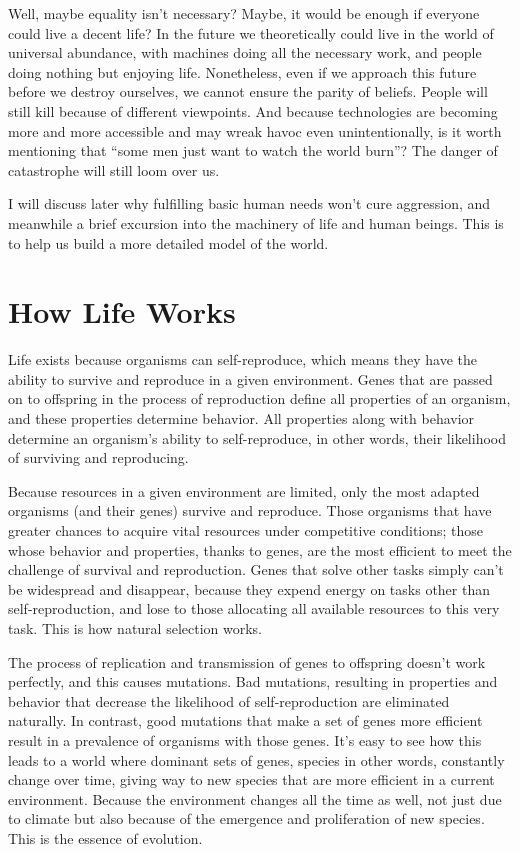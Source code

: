 \documentclass[12pt]{report}
\begin{document}
\noindent Well, maybe equality isn’t necessary? Maybe, it would be enough if everyone could live a decent life? In the future we theoretically could live in the world of universal abundance, with machines doing all the necessary work, and people doing nothing but enjoying life. Nonetheless, even if we approach this future before we destroy ourselves, we cannot ensure the parity of beliefs. People will still kill because of different viewpoints. And because technologies are becoming more and more accessible and may wreak havoc even unintentionally, is it worth mentioning that ``some men just want to watch the world burn''? The danger of catastrophe will still loom over us.

\noindent I will discuss later why fulfilling basic human needs won’t cure aggression, and meanwhile a brief excursion into the machinery of life and human beings. This is to help us build a more detailed model of the world.

\section*{How Life Works}

Life exists because organisms can self-reproduce, which means they have the ability to survive and reproduce in a given environment. Genes that are passed on to offspring in the process of reproduction define all properties of an organism, and these properties determine behavior. All properties along with behavior determine an organism’s ability to self-reproduce, in other words, their likelihood of surviving and reproducing.

\noindent Because resources in a given environment are limited, only the most adapted organisms (and their genes) survive and reproduce. Those organisms that have greater chances to acquire vital resources under competitive conditions; those whose behavior and properties, thanks to genes, are the most efficient to meet the challenge of survival and reproduction. Genes that solve other tasks simply can’t be widespread and disappear, because they expend energy on tasks other than self-reproduction, and lose to those allocating all available resources to this very task. This is how natural selection works.

\noindent The process of replication and transmission of genes to offspring doesn’t work perfectly, and this causes mutations. Bad mutations, resulting in properties and behavior that decrease the likelihood of self-reproduction are eliminated naturally. In contrast, good mutations that make a set of genes more efficient result in a prevalence of organisms with those genes. It’s easy to see how this leads to a world where dominant sets of genes, species in other words, constantly change over time, giving way to new species that are more efficient in a current environment. Because the environment changes all the time as well, not just due to climate but also because of the emergence and proliferation of new species. This is the essence of evolution.
\end{document}

